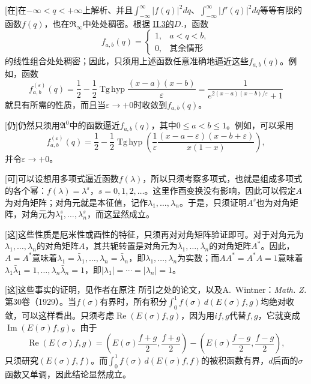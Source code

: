 \documentclass[fontsize=13pt,twoside,openany,headings=normal,parskip=false,bookmarkpackage=false,DIV=calc]{scrbook}
\begin{document}
[在]{在$-\infty<q<+\infty$上解析、并且$\int_{-\infty}^{\infty}|f(q)|^2dq$、$\int_{-\infty}^{\infty}|f'(q)|^2dq$等等有限的函数$f(q)$，也在$\mathfrak R_\infty$中处处稠密。根据 \hyperref[sec:II.3]{II.3的$D.$}，函数
\[
f_{a,b}(q)=\begin{cases}1,&a<q<b,\\0,&\text{其余情形}\end{cases}
\]
的线性组合处处稠密；因此，只须用上述函数任意准确地逼近这些$f_{a,\allowbreak b}(q)$。例如，函数
\[
f^{(\varepsilon)}_{a,b}(q)
=\frac12-\frac12\operatorname{Tg\,hyp}\frac{(x-a)(x-b)}{\varepsilon}
=\frac1{e^{2(x-a)(x-b)/\varepsilon}+1}
\]
就具有所需的性质，而且当$\varepsilon\to+0$时收敛到$f_{a,\allowbreak b}(q)$。\hypertarget{origpage-247}{}\label{origpage-247}}

[仍]{仍然只须用$\mathfrak A^0$中的函数逼近$f_{a,\allowbreak b}(q)$，其中$0\le a<b\le1$。例如，可以采用
\[
f^{(\varepsilon)}_{a,b}(q)=\frac12-\frac12\operatorname{Tg\,hyp}\left(
\frac1\varepsilon\frac{(x-a-\varepsilon)(x-b+\varepsilon)}{x(1-x)}\right),
\]
并令$\varepsilon\to+0$。}

[可]{可以设想用多项式逼近函数$f(\lambda)$，所以只须考察多项式，也就是组成多项式的各个幂：$f(\lambda)=\lambda^s$，$s=0,\allowbreak 1,\allowbreak 2,\allowbreak \ldots$。这里作酉变换没有影响，因此可以假定$A$为对角矩阵；对角元就是本征值，记作$\lambda_1,\allowbreak \ldots,\allowbreak \lambda_n$。于是，只须证明$A^s$也为对角矩阵，对角元为$\lambda_1^s,\allowbreak \ldots,\allowbreak \lambda_n^s$，而这显然成立。}

[这]{这些性质是厄米性或酉性的特征，只须再对对角矩阵验证即可。对于对角元为$\lambda_1,\allowbreak \ldots,\allowbreak \lambda_n$的对角矩阵$A$，其共轭转置是对角元为$\bar\lambda_1,\allowbreak \ldots,\allowbreak \bar\lambda_n$的对角矩阵$A^*$。因此，$A=A^*$意味着$\lambda_1=\bar\lambda_1,\allowbreak \ldots,\allowbreak \lambda_n=\bar\lambda_n$，即$\lambda_1,\allowbreak \ldots,\allowbreak \lambda_n$为实数；而$AA^*=A^*A=1$意味着$\lambda_1\bar\lambda_1=1,\allowbreak \ldots,\allowbreak \lambda_n\bar\lambda_n=1$，即$|\lambda_1|=\cdots=|\lambda_n|=1$。}

[这]{这些事实的证明，见作者在原注 \hyperlink{note-78}{} 所引之处的论文，以及A.~Wintner：\emph{Math. Z.}第30卷（1929）。当$f(\sigma)$有界时，所有积分$\int_0^1 f(\sigma)\,d(E(\sigma)f,\allowbreak g)$均绝对收敛，可以这样看出。只须考虑$\operatorname{Re}(E(\sigma)f,\allowbreak g)$，因为用$if,\allowbreak g$代替$f,\allowbreak g$，它就变成$\operatorname{Im}(E(\sigma)f,\allowbreak g)$。由于
\[
\operatorname{Re}(E(\sigma)f,g)
=\left(E(\sigma)\frac{f+g}{2},\frac{f+g}{2}\right)
-\left(E(\sigma)\frac{f-g}{2},\frac{f-g}{2}\right),
\]
只须研究$(E(\sigma)f,\allowbreak f)$。而$\int_0^1 f(\sigma)\,d(E(\sigma)f,\allowbreak f)$的被积函数有界，$d$后面的$\sigma$函数又单调，因此结论显然成立。}
\end{document}
